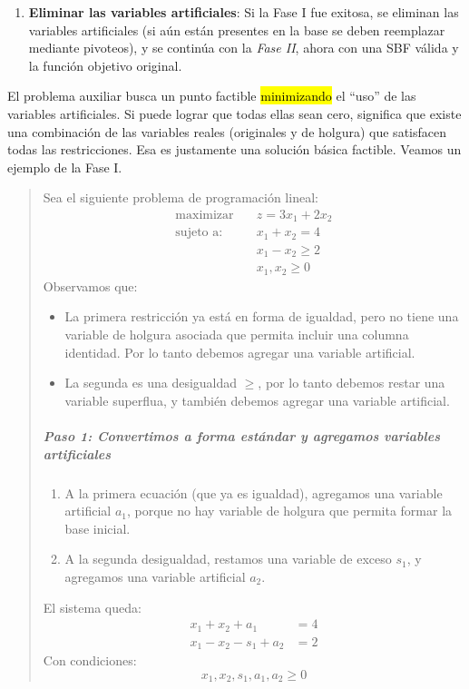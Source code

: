 \begin{enumerate}
  \item \textbf{Eliminar las variables artificiales}: Si la Fase I fue exitosa, se eliminan las variables artificiales (si aún están presentes en la base se deben reemplazar mediante pivoteos), y se continúa con la \textit{Fase II}, ahora con una SBF válida y la función objetivo original.
\end{enumerate}

El problema auxiliar busca un punto factible \hl{minimizando} el ``uso'' de las variables artificiales. Si puede lograr que todas ellas sean cero, significa que existe una combinación de las variables reales (originales y de holgura) que satisfacen todas las restricciones. Esa es justamente una solución básica factible. Veamos un ejemplo de la Fase I.

\begin{quote}
  \ejemplo\label{ej:fase_1} Sea el siguiente problema de programación lineal:
  \begin{align*}
    \text{maximizar} \quad  &z = 3x_1 + 2x_2\\[3pt]
    \text{sujeto a:} \quad  &x_1 + x_2 = 4\\
                            &x_1 - x_2 \geq 2\\
                            &x_1, x_2 \geq 0
  \end{align*}
  Observamos que:
  \begin{itemize}
    \item La primera restricción ya está en forma de igualdad, pero no tiene una variable de holgura asociada que permita incluir una columna identidad. Por lo tanto debemos agregar una variable artificial.
    \item La segunda es una desigualdad \(\geq\), por lo tanto debemos restar una variable superflua, y también debemos agregar una variable artificial.
  \end{itemize}
  
  \subparagraph{Paso 1: Convertimos a forma estándar y agregamos variables artificiales}
  \begin{enumerate}
    \item A la primera ecuación (que ya es igualdad), agregamos una variable artificial \(a_1\), porque no hay variable de holgura que permita formar la base inicial.
    \item A la segunda desigualdad, restamos una variable de exceso \(s_1\), y agregamos una variable artificial \(a_2\).
  \end{enumerate}
  El sistema queda:
  \begin{align*}
    x_1 + x_2 + a_1 &= 4\\
    x_1 - x_2 - s_1 + a_2 &= 2
  \end{align*}  
  Con condiciones:
  \[
    x_1, x_2, s_1, a_1, a_2 \geq 0
  \]


\end{quote}
